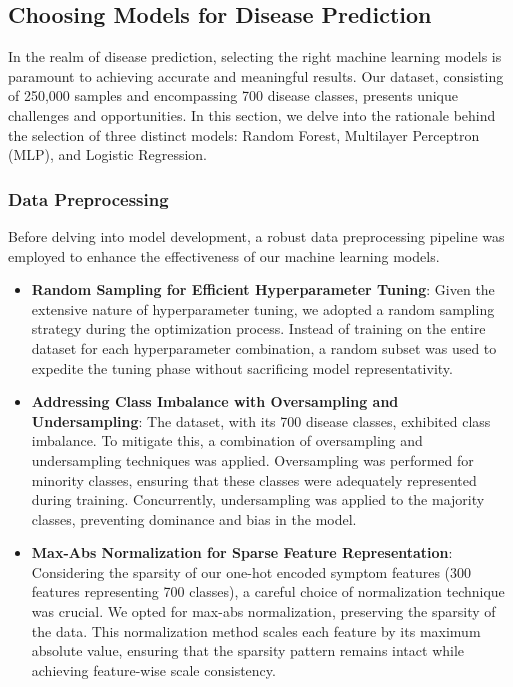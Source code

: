 \subsection{Choosing Models for Disease Prediction}
In the realm of disease prediction, selecting the right machine learning models is paramount to achieving accurate and meaningful results. Our dataset, consisting of 250,000 samples and encompassing 700 disease classes, presents unique challenges and opportunities. In this section, we delve into the rationale behind the selection of three distinct models: Random Forest, Multilayer Perceptron (MLP), and Logistic Regression.

\subsubsection{Data Preprocessing}
Before delving into model development, a robust data preprocessing pipeline was employed to enhance the effectiveness of our machine learning models.
\begin{itemize}
    \item \textbf{Random Sampling for Efficient Hyperparameter Tuning}: Given the extensive nature of hyperparameter tuning, we adopted a random sampling strategy during the optimization process. Instead of training on the entire dataset for each hyperparameter combination, a random subset was used to expedite the tuning phase without sacrificing model representativity.
    \item \textbf{Addressing Class Imbalance with Oversampling and Undersampling}: The dataset, with its 700 disease classes, exhibited class imbalance. To mitigate this, a combination of oversampling and undersampling techniques was applied. Oversampling was performed for minority classes, ensuring that these classes were adequately represented during training. Concurrently, undersampling was applied to the majority classes, preventing dominance and bias in the model.
    \item \textbf{Max-Abs Normalization for Sparse Feature Representation}: Considering the sparsity of our one-hot encoded symptom features (300 features representing 700 classes), a careful choice of normalization technique was crucial. We opted for max-abs normalization, preserving the sparsity of the data. This normalization method scales each feature by its maximum absolute value, ensuring that the sparsity pattern remains intact while achieving feature-wise scale consistency.
\end{itemize}

